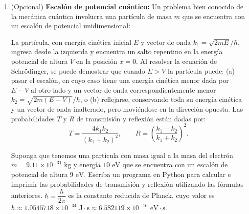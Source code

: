 \documentclass[12pt]{article}
\begin{document}
\begin{problemas}[]
\begin{enumerate}[leftmargin=*]
\item {\color{blue}(Opcional)} \textbf{Escalón de potencial cuántico:} 
Un problema bien conocido de la mecánica cuántica involucra una partícula de masa $m$ que se 
encuentra con un escalón de potencial unidimensional:

\begin{center}
\end{center}

La partícula, con energía cinética inicial $E$ y vector de onda $k_1 = \sqrt{2mE}/\hbar$, 
ingresa desde la izquierda y encuentra un salto repentino en la energía potencial de altura $V$ 
en la posición $x = 0$. Al resolver la ecuación de Schrödinger, se puede demostrar que cuando $E > V$ la partícula puede: (a) pasar el escalón, en cuyo caso tiene una energía cinética menor dada por $E - V$ al otro lado y un vector de onda correspondientemente menor $k_2 = \sqrt{2m(E - V)}/\hbar$, o (b) reflejarse, conservando toda su energía cinética y un vector de onda inalterado, pero moviéndose en la dirección opuesta. Las probabilidades $T$ y $R$ de transmisión y reflexión están dadas por:
\begin{equation*}
    T = \frac{4k_1 k_2}{(k_1 + k_2)^2}, \qquad R = \left( \frac{k_1 - k_2}{k_1 + k_2} \right)^2.
\end{equation*}

Suponga que tenemos una partícula con masa igual a la masa del electrón 
$m = 9.11 \times 10^{-31} \text{ kg}$ y energía $10 \text{ eV}$ 
que se encuentra con un escalón de potencial de altura $9 \text{ eV}$. 
Escriba un programa en Python para calcular e imprimir las probabilidades de transmisión y 
reflexión utilizando las fórmulas anteriores. $\hbar = \dfrac{h}{2\pi}$ es la constante reducida 
de Planck, cuyo valor es 
$\hbar \approx 1.0545718 \times 10^{-34} \text{ J}\cdot\text{s} \approx 6.582119 \times 10^{-16} \text{ eV}\cdot\text{s}$.

\end{enumerate}

\end{problemas}



\label{LastPage}
\end{document}
